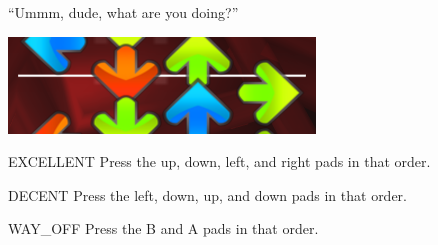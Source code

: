 ``Ummm, dude, what are you doing?''

\begin{center}
  \includegraphics{itg-udru.png}
\end{center}

\begin{switch}
\item{EXCELLENT}
  Press the up, down, left, and right pads in that order.
\item{DECENT}
  Press the left, down, up, and down pads in that order.
\item{WAY\_OFF}
  Press the B and A pads in that order.
\end{switch}



